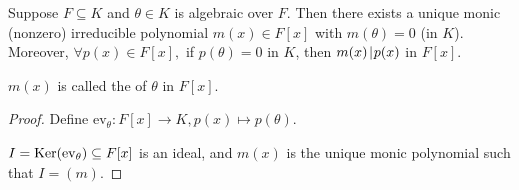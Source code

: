 \documentclass[notes.tex]{subfiles}
\begin{document}
\begin{proposition}
	Suppose $F\subseteq K$ and $\theta\in K$ is algebraic over $F$. Then there exists a unique monic (nonzero) irreducible polynomial $m(x)\in F[x]$ with $m(\theta)=0$ (in $K$).
	Moreover, $\forall p(x)\in F[x],$ if $p(\theta) = 0$ in $K$, then $m(x)\mkern2mu|\mkern1mu p(x)$ in $F[x]$.
\end{proposition}
\begin{defn}
	$m(x)$ is called the  of $\theta$ in $F[x].$
\end{defn}
\begin{proof}
	Define $\mathrm{ev}_\theta:F[x]\to K, p(x)\mapsto p(\theta)$.

	$I = \operatorname{\mathrm{Ker}}(\mathrm{ev}_\theta)\subseteq F[x]$ is an ideal, and $m(x)$ is the unique monic polynomial such that $I = (m)$.
\end{proof}
\end{document}

